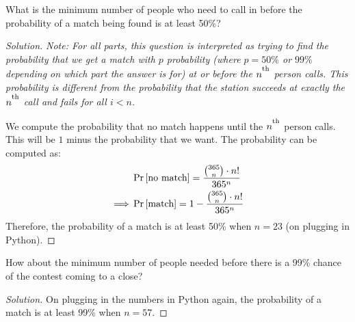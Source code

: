 \begin{solution}[label=ques:2a]
  \begin{question}
    What is the minimum number of people who need to call in before the probability of a match being found is at least 50\%?
  \end{question}
  \tcblower{}
  \begin{proof}[Solution]
    \textit{Note: For all parts, this question is interpreted as trying to find the probability that we get a match with $p$ probability (where $p = 50\%$ or $99\%$ depending on which part the answer is for) at or before the $n^\textsuperscript{th}$ person calls. This probability is different from the probability that the station succeeds at exactly the $n^\textsuperscript{th}$ call and fails for all $i < n$.}

    We compute the probability that no match happens until the $n^\textsuperscript{th}$ person calls. This will be $1$ minus the probability that we want. The probability can be computed as:
    \begin{equation}
      \begin{split}
        &\Pr\left[ \text{no match} \right] = \frac{\binom{365}{n}\cdot n!}{365^n}\\
        \implies &\Pr\left[ \text{match} \right] = 1 - \frac{\binom{365}{n}\cdot n!}{365^n}
      \end{split}
      \label{eq:bbnomatch}
    \end{equation}
    Therefore, the probability of a match is at least 50\% when $n = 23$ (on plugging in Python).
  \end{proof}
\end{solution}

\begin{solution}[label=ques:2b]
  \begin{question}
    How about the minimum number of people needed before there is a 99\% chance of the contest coming to a close?
  \end{question}
  \tcblower{}
  \begin{proof}[Solution]
    On plugging in the numbers in Python again, the probability of a match is at least 99\% when $n = 57$.
  \end{proof}
\end{solution}

